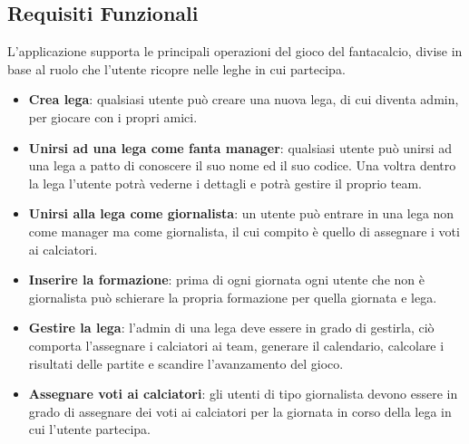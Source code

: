 \subsection{Requisiti Funzionali}
L'applicazione supporta le principali operazioni del gioco del fantacalcio, divise in base al ruolo
che l'utente ricopre nelle leghe in cui partecipa.
\begin{itemize}
    \item \textbf{Crea lega}: qualsiasi utente può creare una nuova lega, di cui diventa admin,
     per giocare con i propri amici.
    \item \textbf{Unirsi ad una lega come fanta manager}: qualsiasi utente può unirsi
    ad una lega a patto di conoscere il suo nome ed il suo codice. Una voltra dentro la
    lega l'utente potrà vederne i dettagli e potrà gestire il proprio team.
    \item \textbf{Unirsi alla lega come giornalista}: un utente può entrare in una lega non come manager
    ma come giornalista, il cui compito è quello di assegnare i voti ai calciatori.
    \item \textbf{Inserire la formazione}: prima di ogni giornata ogni utente che non è
    giornalista può schierare la propria formazione per quella giornata e lega.
    \item \textbf{Gestire la lega}: l'admin di una lega deve essere in grado di gestirla,
    ciò comporta l'assegnare i calciatori ai team, generare il calendario, calcolare i risultati
    delle partite e scandire l'avanzamento del gioco.
    \item \textbf{Assegnare voti ai calciatori}: gli utenti di tipo giornalista devono essere in grado di assegnare
    dei voti ai calciatori per la giornata in corso della lega in cui l'utente partecipa.
\end{itemize}

